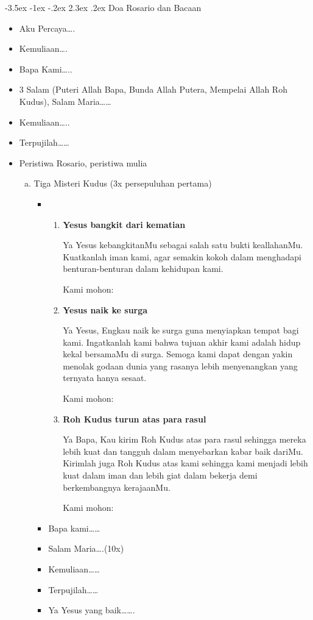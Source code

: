 \documentclass[a5paper,titlepage,12pt]{scrbook}
\makeatletter
\renewcommand{\section}{\@startsection {section}{1}{\z@}%
                                   {-3.5ex \@plus -1ex \@minus -.2ex}%
                                   {2.3ex \@plus.2ex}%
                                   {\normalfont\normalsize\bfseries}}
\makeatother
\begin{document}
\section{Doa Rosario dan Bacaan}
\begin{itemize}
	\item Aku Percaya{\dots}.
	\item Kemuliaan{\dots}.
	\item Bapa Kami{\dots}..
	\item 3 Salam (Puteri Allah Bapa, Bunda Allah Putera, Mempelai Allah Roh Kudus), Salam Maria{\dots}{\dots}
	\item Kemuliaan{\dots}..
	\item Terpujilah{\dots}{\dots}
	\item Peristiwa Rosario, peristiwa mulia 
	
	\begin{enumerate}[a.]
		\item Tiga Misteri Kudus (3x persepuluhan pertama)		
			\begin{itemize}
				\item 
				 	\begin{enumerate}
						\item \textbf{Yesus bangkit dari kematian}
						
Ya Yesus kebangkitanMu sebagai salah satu bukti keallahanMu. Kuatkanlah iman kami, agar semakin kokoh dalam menghadapi benturan-benturan dalam kehidupan kami.

Kami mohon:						
						
						\item \textbf{Yesus naik ke surga}
						
Ya Yesus, Engkau naik ke surga guna menyiapkan tempat bagi kami. Ingatkanlah kami bahwa tujuan akhir kami adalah hidup kekal bersamaMu di surga. Semoga kami dapat dengan yakin menolak godaan dunia yang rasanya lebih menyenangkan yang ternyata hanya sesaat.

Kami mohon:

						\item \textbf{Roh Kudus turun atas para rasul}

Ya Bapa, Kau kirim Roh Kudus atas para rasul sehingga mereka lebih kuat dan tangguh dalam menyebarkan kabar baik dariMu. Kirimlah juga Roh Kudus atas kami sehingga kami menjadi lebih kuat dalam iman dan lebih giat dalam bekerja demi berkembangnya kerajaanMu. 

Kami mohon:

					\end{enumerate}
				\item Bapa kami{\dots}{\dots}
				\item Salam Maria{\dots}.(10x)
				\item Kemuliaan{\dots}{\dots}
				\item Terpujilah{\dots}{\dots}
				\item Ya Yesus yang baik{\dots}{\dots}.
			\end{itemize}


\end{enumerate}
\end{itemize}
\end{document}
